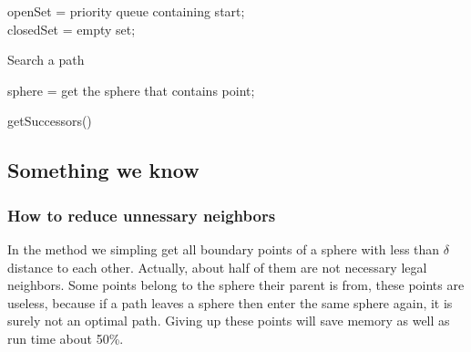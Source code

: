 \documentclass{article}
\begin{document}
  \label{Path searching algorithm}
  \begin{algorithm}[H]
  openSet = priority queue containing start; \\
  closedSet = empty set; \\
  \caption{ Search a path }
  \end{algorithm}


 \begin{algorithm}
  sphere = get the sphere that contains point; \\
 \caption{ getSuccessors()\label{IR} }
 \end{algorithm}
 
  \subsection{Something we know}
    \subsubsection{How to reduce unnessary neighbors}
      In the method we simpling get all boundary points of a sphere with less than $\delta$ distance to each other. Actually, about half of them are not necessary legal neighbors. Some points belong to the sphere their parent is from, these points are useless, because if a path leaves a sphere then enter the same sphere again, it is surely not an optimal path. Giving up these points will save memory as well as run time about 50\%. 
\end{document}
